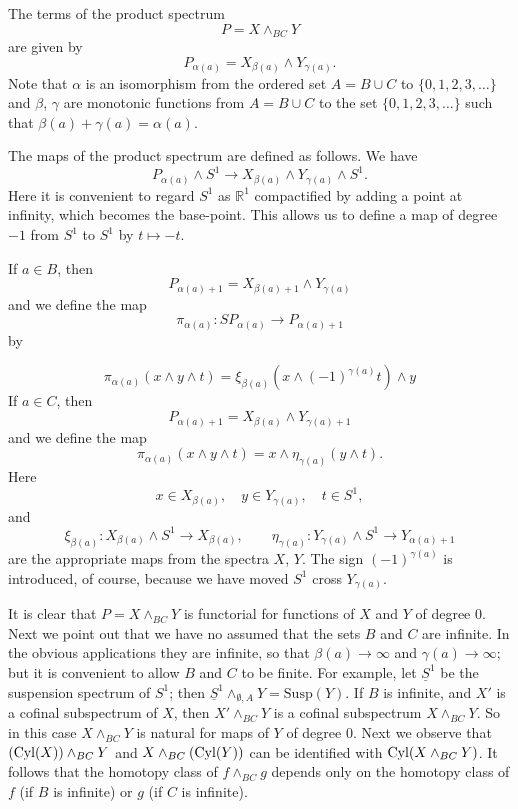 \documentclass[../main]{subfiles}
\begin{document}
The terms of the product spectrum
\[
    P = X \wedge_{BC} Y
\]
are given by
\[
    P_{\alpha(a)} = X_{\beta(a)} \wedge Y_{\gamma(a)}.
\]
Note that $\alpha$ is an isomorphism from the ordered set $A = B \cup C$ to $\{0, 1, 2, 3, \ldots\}$ and $\beta$, $\gamma$ are monotonic functions from $A = B \cup C$ to the set $\{0, 1, 2, 3, \ldots\}$ such that $\beta(a) + \gamma(a) = \alpha(a)$.

The maps of the product spectrum are defined as follows.
We have
\[
    P_{\alpha(a)} \wedge S^{1} \longrightarrow X_{\beta(a)} \wedge Y_{\gamma(a)} \wedge S^{1}.
\]
Here it is convenient to regard $S^{1}$ as $\mathbb{R}^{1}$ compactified by adding a point at infinity, which becomes the base-point.
This allows us to define a map of degree $-1$ from $S^{1}$ to $S^{1}$ by $t \mapsto -t$.

If $a \in B$, then
\[
    P_{\alpha(a) + 1} = X_{\beta(a) + 1} \wedge Y_{\gamma(a)}
\]
and we define the map
\[
    \pi_{\alpha(a)} \colon SP_{\alpha(a)} \longrightarrow P_{\alpha(a) + 1}
\]
by 

\[
    \pi_{\alpha(a)}(x \wedge y \wedge t) = \xi_{\beta(a)} (x \wedge (-1)^{\gamma(a)}t ) \wedge y
\]
If $a\in C$, then
\[
    P_{\alpha(a)+1}=X_{\beta(a)}\wedge Y_{\gamma(a)+1}
\]
and we define the map
\[
    \pi_{\alpha(a)}(x \wedge y \wedge t) = x \wedge \eta_{\gamma(a)} (y \wedge t).
\]
Here
\[
    x \in X_{\beta(a)}, \quad y \in Y_{\gamma(a)}, \quad t \in S^{1},
\]
and
\[
    \xi_{\beta(a)} \colon X_{\beta(a)} \wedge S^{1} \longrightarrow X_{\beta(a)}, \qquad \eta_{\gamma(a)} \colon Y_{\gamma(a)} \wedge S^{1} \longrightarrow Y_{\alpha(a) + 1}
\]
are the appropriate maps from the spectra $X$, $Y$.
The sign $(-1)^{\gamma(a)}$ is introduced, of course, because we have moved $S^{1}$ cross $Y_{\gamma(a)}$.

It is clear that $P = X \wedge_{BC} Y$ is functorial for functions of $X$ and $Y$ of degree 0.
Next we point out that we have no assumed that the sets $B$ and $C$ are infinite.
In the obvious applications they are infinite, so that $\beta(a) \longrightarrow \infty$ and $\gamma(a) \longrightarrow \infty$;
but it is convenient to allow $B$ and $C$ to be finite.
For example, let $\underline{S}^{1}$ be the suspension spectrum of $S^{1}$;
then $\underline{S}^{1} \wedge_{\emptyset, A} Y = \mathrm{Susp}(Y)$.
If $B$ is infinite, and $X'$ is a cofinal subspectrum of $X$, then $X' \wedge_{BC} Y$ is a cofinal subspectrum $X \wedge_{BC} Y$.
So in this case $X \wedge_{BC} Y$ is natural for maps of $Y$ of degree 0.
Next we observe that $(\mathop{\mathrm{Cyl}}(X)) \wedge_{BC} Y$ and $X \wedge_{BC} (\mathop{\mathrm{Cyl}}(Y))$ can be identified with $\mathop{\mathrm{Cyl}}(X \wedge_{BC} Y)$.
It follows that the homotopy class of $f \wedge_{BC} g$ depends only on the homotopy class of $f$ (if $B$ is infinite) or $g$ (if $C$ is infinite).
\end{document}

